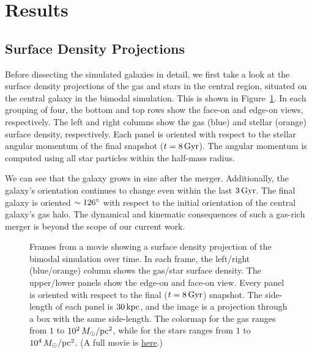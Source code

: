 \section{Results}\label{sec:results}
\subsection{Surface Density Projections}\label{ssec:projections}
Before dissecting the simulated galaxies in detail, we first take a look at the surface density projections of the gas and stars in the central region, situated on the central galaxy in the bimodal simulation. This is shown in Figure~\ref{fig:projections}. In each grouping of four, the bottom and top rows show the face-on and edge-on views, respectively. The left and right columns show the gas (blue) and stellar (orange) surface density, respectively. Each panel is oriented with respect to the stellar angular momentum of the final snapshot ($t=8\,\textrm{Gyr}$). The angular momentum is computed using all star particles within the half-mass radius.

We can see that the galaxy grows in size after the merger. Additionally, the galaxy's orientation continues to change even within the last $3\,\textrm{Gyr}$. The final galaxy is oriented $\sim126\degree$ with respect to the initial orientation of the central galaxy's gas halo. The dynamical and kinematic consequences of such a gas-rich merger is beyond the scope of our current work.

\begin{figure*}
  \centering

  \caption{Frames from a movie showing a surface density projection of the bimodal simulation over time. In each frame, the left/right (blue/orange) column shows the gas/star surface density. The upper/lower panels show the edge-on and face-on view. Every panel is oriented with respect to the final ($t=8\,\textrm{Gyr}$) snapshot. The side-length of each panel is $30\,\textrm{kpc}$, and the image is a projection through a box with the same side-length. The colormap for the gas ranges from $1$ to $10^2\,M_{\odot}/\textrm{pc}^2$, while for the stars ranges from $1$ to $10^4\,M_{\odot}/\textrm{pc}^2$. (A full movie is \href{https://drive.google.com/file/d/1RKpFpnFIpl7XYAX5lvF7CyaPVO5dS3EO/view?usp=drive_link}{here}.)}
  \label{fig:projections}
\end{figure*}

